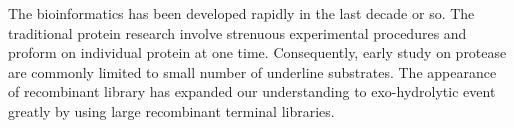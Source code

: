 The bioinformatics has been developed rapidly in the last decade or so. The traditional protein research involve strenuous experimental procedures and proform on individual protein at one time. Consequently, early study on protease are commonly limited to small number of underline substrates. The appearance of recombinant library has expanded our understanding to exo-hydrolytic event greatly by using large recombinant terminal libraries. 